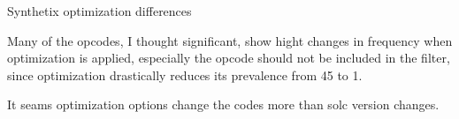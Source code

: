 \documentclass[../main.tex]{subfiles}
\begin{document}
\begin{table}[ht!]
  \centering
  \scriptsize
  \caption{Synthetix optimization differences}
  \label{tbl:opt_diff}
\end{table}

Many of the opcodes, I thought significant, show hight changes in frequency when optimization is applied, especially the  opcode should not be included in the filter, since optimization drastically reduces its prevalence from 45 to 1.

It seams optimization options change the codes more than solc version changes.
\end{document}
